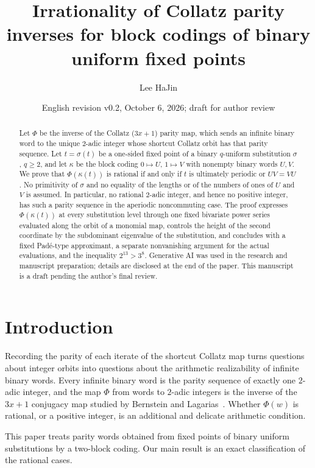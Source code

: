 \documentclass[11pt]{amsart}
\title[Collatz parity inverses of block-coded uniform fixed points]{Irrationality of Collatz parity inverses for block codings of binary uniform fixed points}
\author{Lee HaJin}
\date{English revision v0.2, October 6, 2026; draft for author review}
\theoremstyle{remark}
\theoremstyle{definition}
\numberwithin{equation}{section}
\begin{document}
\begin{abstract}
Let $\Phi$ be the inverse of the Collatz ($3x+1$) parity map, which sends an infinite binary word to the unique $2$-adic integer whose shortcut Collatz orbit has that parity sequence. Let $t=\sigma(t)$ be a one-sided fixed point of a binary $q$-uniform substitution $\sigma$, $q\ge 2$, and let $\kappa$ be the block coding $0\mapsto U$, $1\mapsto V$ with nonempty binary words $U,V$. We prove that $\Phi(\kappa(t))$ is rational if and only if $t$ is ultimately periodic or $UV=VU$. No primitivity of $\sigma$ and no equality of the lengths or of the numbers of ones of $U$ and $V$ is assumed. In particular, no rational $2$-adic integer, and hence no positive integer, has such a parity sequence in the aperiodic noncommuting case. The proof expresses $\Phi(\kappa(t))$ at every substitution level through one fixed bivariate power series evaluated along the orbit of a monomial map, controls the height of the second coordinate by the subdominant eigenvalue of the substitution, and concludes with a fixed Pad\'e-type approximant, a separate nonvanishing argument for the actual evaluations, and the inequality $2^{13}>3^{8}$.
Generative AI was used in the research and manuscript preparation; details are disclosed at the end of the paper. This manuscript is a draft pending the author's final review.
\end{abstract}

\maketitle

\section{Introduction}\label{sec:intro}

Recording the parity of each iterate of the shortcut Collatz map turns questions about integer orbits into questions about the arithmetic realizability of infinite binary words. Every infinite binary word is the parity sequence of exactly one $2$-adic integer, and the map $\Phi$ from words to $2$-adic integers is the inverse of the $3x+1$ conjugacy map studied by Bernstein and Lagarias~\cite{BL1996}. Whether $\Phi(w)$ is rational, or a positive integer, is an additional and delicate arithmetic condition.

This paper treats parity words obtained from fixed points of binary uniform substitutions by a two-block coding. Our main result is an exact classification of the rational cases.
\end{document}
